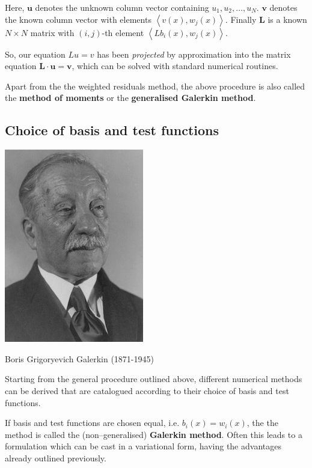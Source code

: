 Here, $\mathbf u$ denotes the unknown column vector containing $u_1, u_2, \hdots, u_N$. $\mathbf v$ denotes the known column vector with elements $\left\langle v(x), w_j(x) \right\rangle$. Finally ${\mathbf L}$ is a known $N \times N$ matrix with $(i,j)$-th element $\left\langle L b_i(x), w_j(x) \right\rangle$.

So, our equation $Lu=v$ has been \emph{projected} by approximation into the matrix equation ${\mathbf L} \cdot {\mathbf u} = {\mathbf v}$, which can be solved with standard numerical routines.

Apart from the the weighted residuals method, the above procedure is also called the \textbf{method of moments} or the \textbf{generalised Galerkin method}.

\subsection{Choice of basis and test functions}

\begin{marginfigure}[-.0cm]
  \includegraphics{numeric/figures/b_galerkin}
  \caption{Boris Grigoryevich Galerkin (1871-1945)}
\end{marginfigure}

Starting from the general procedure outlined above, different numerical methods can be derived that are catalogued according to their choice of basis and test functions.

If basis and test functions are chosen equal, i.e. $b_i(x) = w_i(x)$, the the method is called the (non--generalised) \textbf{Galerkin method}. Often this leads to a formulation which can be cast in a variational form, having the advantages already outlined previously.

